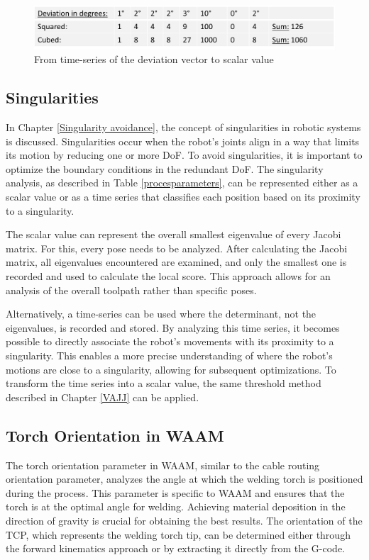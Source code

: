 \begin{figure}[H]
	\centerline{\includegraphics[width=.9\textwidth]{figures/devi.png}}
	\caption{From time-series of the deviation vector to scalar value}
	\label{deviation}
\end{figure}
 

\subsection{Singularities}

In Chapter \ref{Singularity avoidance}, the concept of singularities in robotic systems is discussed. Singularities occur when the robot's joints align in a way that limits its motion by reducing one or more DoF. To avoid singularities, it is important to optimize the boundary conditions in the redundant DoF. The singularity analysis, as described in Table \ref{procesparameters}, can be represented either as a scalar value or as a time series that classifies each position based on its proximity to a singularity.

The scalar value can represent the overall smallest eigenvalue of every Jacobi matrix. For this, every pose needs to be analyzed. After calculating the Jacobi matrix, all eigenvalues encountered are examined, and only the smallest one is recorded and used to calculate the local score. This approach allows for an analysis of the overall toolpath rather than specific poses.

Alternatively, a time-series can be used where the determinant, not the eigenvalues, is recorded and stored. By analyzing this time series, it becomes possible to directly associate the robot's movements with its proximity to a singularity. This enables a more precise understanding of where the robot's motions are close to a singularity, allowing for subsequent optimizations. To transform the time series into a scalar value, the same threshold method described in Chapter \ref{VAJJ} can be applied.
  
  

\subsection{Torch Orientation in WAAM}
The torch orientation parameter in WAAM, similar to the cable routing orientation parameter, analyzes the angle at which the welding torch is positioned during the process. This parameter is specific to WAAM and ensures that the torch is at the optimal angle for welding. Achieving material deposition in the direction of gravity is crucial for obtaining the best results. The orientation of the TCP, which represents the welding torch tip, can be determined either through the forward kinematics approach or by extracting it directly from the G-code.

